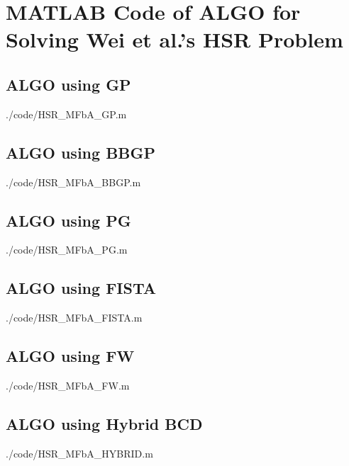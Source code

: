 \chapter{MATLAB Code of ALGO for Solving Wei et al.'s HSR Problem}

\section{ALGO using GP}

                {./code/HSR_MFbA_GP.m}
\newpage
\section{ALGO using BBGP}

                {./code/HSR_MFbA_BBGP.m}
\newpage
\section{ALGO using PG}

                {./code/HSR_MFbA_PG.m}
\newpage
\section{ALGO using FISTA}

                {./code/HSR_MFbA_FISTA.m}
\newpage
\section{ALGO using FW}

                {./code/HSR_MFbA_FW.m}
\newpage
\section{ALGO using Hybrid BCD}

                {./code/HSR_MFbA_HYBRID.m}

